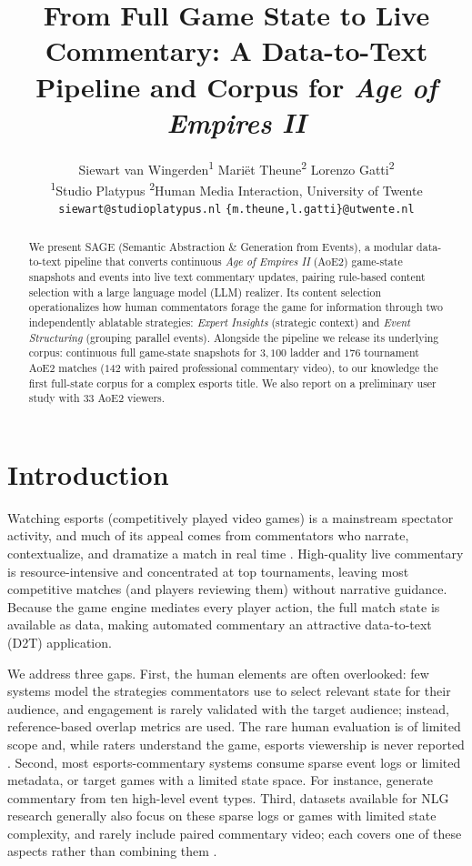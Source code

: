 \documentclass[11pt]{article}
\title{From Full Game State to Live Commentary: A Data-to-Text Pipeline and Corpus for \textit{Age of Empires II}}
\author{
  Siewart van Wingerden\textsuperscript{1} \quad
  Mari\"et Theune\textsuperscript{2} \quad
  Lorenzo Gatti\textsuperscript{2} \\
  \textsuperscript{1}Studio Platypus \quad
  \textsuperscript{2}Human Media Interaction, University of Twente \\
  \texttt{siewart@studioplatypus.nl} \quad
  \texttt{\{m.theune,l.gatti\}@utwente.nl}
}
\begin{document}
\maketitle

\begin{abstract}
  We present SAGE (Semantic Abstraction \& Generation from Events), a modular data-to-text pipeline that converts continuous \textit{Age of Empires II} (AoE2) game-state snapshots and events into live text commentary updates, pairing rule-based content selection with a large language model (LLM) realizer. Its content selection operationalizes how human commentators forage the game for information through two independently ablatable strategies: \emph{Expert Insights} (strategic context) and \emph{Event Structuring} (grouping parallel events). Alongside the pipeline we release its underlying corpus: continuous full game-state snapshots for $3{,}100$ ladder and $176$ tournament AoE2 matches ($142$ with paired professional commentary video), to our knowledge the first full-state corpus for a complex esports title. We also report on a preliminary user study with $33$ AoE2 viewers.
\end{abstract}

\section{Introduction}
Watching esports (competitively played video games) is a mainstream spectator activity, and much of its appeal comes from commentators who narrate, contextualize, and dramatize a match in real time \citep{kempecook2019,li2020}. High-quality live commentary is resource-intensive and concentrated at top tournaments, leaving most competitive matches (and players reviewing them) without narrative guidance. Because the game engine mediates every player action, the full match state is available as data, making automated commentary an attractive data-to-text (D2T) application.

We address three gaps. First, the human elements are often overlooked: few systems model the strategies commentators use to select relevant state for their audience, and engagement is rarely validated with the target audience; instead, reference-based overlap metrics are used. The rare human evaluation is of limited scope and, while raters understand the game, esports viewership is never reported \citep{ishigaki2023,wang2024,elarewaju2020}. Second, most esports-commentary systems consume sparse event logs or limited metadata, or target games with a limited state space. For instance, \citet{wang2024} generate commentary from ten high-level event types. Third, datasets available for NLG research generally also focus on these sparse logs or games with limited state complexity, and rarely include paired commentary video; each covers one of these aspects rather than combining them \citep{wang2024,ishigaki2021,zhang2024}.
\end{document}
